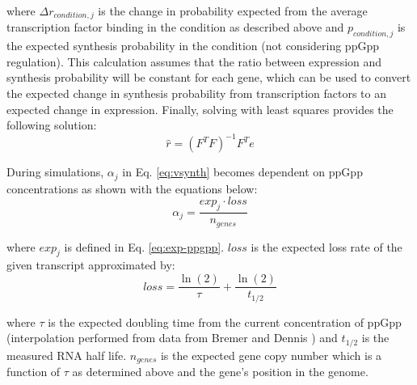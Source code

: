 \documentclass[12pt]{article}
\begin{document}
\noindent where $\Delta r_{condition, j}$ is the change in probability expected from the average transcription factor binding in the condition as described above and $p_{condition, j}$ is the expected synthesis probability in the condition (not considering ppGpp regulation).  This calculation assumes that the ratio between expression and synthesis probability will be constant for each gene, which can be used to convert the expected change in synthesis probability from transcription factors to an expected change in expression.  Finally, solving with least squares provides the following solution:
\begin{equation}
\hat{r} = (F^TF)^{-1}F^Te
\end{equation}

During simulations, $\alpha_j$ in Eq. \ref{eq:vsynth} becomes dependent on ppGpp concentrations as shown with the equations below:
\begin{equation}
\alpha_j = \frac{exp_j\cdot loss}{n_{genes}}
\end{equation}

\noindent where $exp_j$ is defined in Eq. \ref{eq:exp-ppgpp}. $loss$ is the expected loss rate of the given transcript approximated by:
\begin{equation}
loss = \frac{\ln(2)}{\tau} + \frac{\ln(2)}{t_{1/2}}
\end{equation}

\noindent where $\tau$ is the expected doubling time from the current concentration of ppGpp (interpolation performed from data from Bremer and Dennis \cite{Bremer:1996uj}) and $t_{1/2}$ is the measured RNA half life.  $n_{genes}$ is the expected gene copy number which is a function of $\tau$ as determined above and the gene's position in the genome.

\hspace{1cm}
\end{document}
